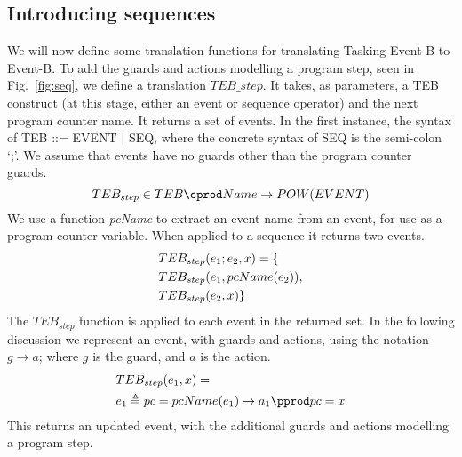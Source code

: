 \subsection{Introducing sequences}
We will now define some translation functions for translating Tasking Event-B to Event-B.  To add the guards and actions modelling a program step, seen in Fig.~\ref{fig:seq}, we define a translation $TEB\_{step}$. It takes, as parameters, a TEB construct (at this stage, either an event or sequence operator) and the next program counter name. It returns a set of events. In the first instance, the syntax of TEB ::= EVENT $|$ SEQ, where the concrete syntax of SEQ is the semi-colon `;'. We assume that events have no guards other than the program counter guards.
%
\begin{equation}
TEB_{step} \in  TEB \cprod Name \rightarrow POW(EVENT)
\notag
\end{equation}
%
We use a function \emph{pcName} to extract an event name from an event, for use as a program counter variable. When applied to a sequence it returns two events. 
%
\begin{equation}
\begin{split}
&TEB_{step}(e_1 ; e_2, x) = \{\\
&TEB_{step}(e_1, pcName(e_2)),\\
&TEB_{step}(e_2, x)\}
\end{split}
\notag
\end{equation}
%
The $TEB_{step}$ function is applied to each event in the returned set. In the following discussion we represent an event, with guards and actions, using the notation $g \rightarrow a$; where $g$ is the guard, and $a$ is the action. 
\begin{equation}
\begin{split}
&TEB_{step}(e_1, x) = \\
&e_1 \triangleq pc = pcName(e_1) \rightarrow a_1 \pprod pc = x
\end{split}
\notag
\end{equation}
This returns an updated event, with the additional guards and actions modelling a program step.

